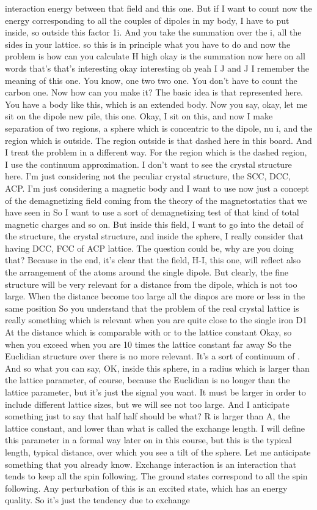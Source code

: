 interaction energy between that field and this one. But if I want to count now the energy corresponding to all the couples of dipoles in my body, I have to put inside, so outside this factor 1i. And you take the summation over the i, all the sides in your lattice. so this is in principle what you have to do and now the problem is how can you calculate H high okay is the summation now here on all words that's that's interesting okay interesting oh yeah I J and J I remember the meaning of this one. You know, one two two one. You don't have to count the carbon one. Now how can you make it? The basic idea is that represented here. You have a body like this, which is an extended body. Now you say, okay, let me sit on the dipole new pile, this one. Okay, I sit on this, and now I make separation of two regions, a sphere which is concentric to the dipole, nu i, and the region which is outside. The region outside is that dashed here in this board. And I treat the problem in a different way. For the region which is the dashed region, I use the continuum approximation. I don't want to see the crystal structure here. I'm just considering not the peculiar crystal structure, the SCC, DCC, ACP. I'm just considering a magnetic body and I want to use now just a concept of the demagnetizing field coming from the theory of the magnetostatics that we have seen in So I want to use a sort of demagnetizing test of that kind of total magnetic charges and so on. But inside this field, I want to go into the detail of the structure, the crystal structure, and inside the sphere, I really consider that having DCC, FCC of ACP lattice. The question could be, why are you doing that? Because in the end, it's clear that the field, H-I, this one, will reflect also the arrangement of the atoms around the single dipole. But clearly, the fine structure will be very relevant for a distance from the dipole, which is not too large. When the distance become too large all the diapos are more or less in the same position So you understand that the problem of the real crystal lattice is really something which is relevant when you are quite close to the single iron D1 At the distance which is comparable with or to the lattice constant Okay, so when you exceed when you are 10 times the lattice constant far away So the Euclidian structure over there is no more relevant. It's a sort of continuum of . And so what you can say, OK, inside this sphere, in a radius which is larger than the lattice parameter, of course, because the Euclidian is no longer than the lattice parameter, but it's just the signal you want. It must be larger in order to include different lattice sizes, but we will see not too large. And I anticipate something just to say that half half should be what? R is larger than A, the lattice constant, and lower than what is called the exchange length. I will define this parameter in a formal way later on in this course, but this is the typical length, typical distance, over which you see a tilt of the sphere. Let me anticipate something that you already know. Exchange interaction is an interaction that tends to keep all the spin following. The ground states correspond to all the spin following. Any perturbation of this is an excited state, which has an energy quality. So it's just the tendency due to exchange 